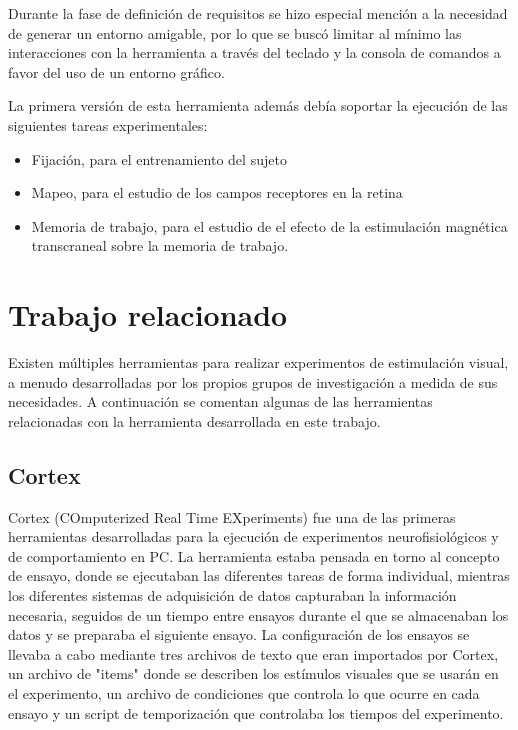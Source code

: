 \documentclass[conference]{IEEEtran}
\begin{document}
Durante la fase de definición de requisitos se hizo especial mención a la necesidad de generar un entorno amigable, por lo que se buscó limitar al mínimo las interacciones con la herramienta a través del teclado y la consola de comandos a favor del uso de un entorno gráfico.

La primera versión de esta herramienta además debía soportar la ejecución de las siguientes tareas experimentales:

\begin{itemize}
	\item Fijación, para el entrenamiento del sujeto
	\item Mapeo, para el estudio de los campos receptores en la retina
	\item Memoria de trabajo, para el estudio de el efecto de la estimulación magnética transcraneal sobre la memoria de trabajo.
\end{itemize}

\section{Trabajo relacionado}

Existen múltiples herramientas para realizar experimentos de estimulación visual, a menudo desarrolladas por los propios grupos de investigación a medida de sus necesidades. A continuación se comentan algunas de las herramientas relacionadas con la herramienta desarrollada en este trabajo.

\subsection{Cortex}

Cortex (COmputerized Real Time EXperiments)\cite{cortex} fue una de las primeras herramientas desarrolladas para la ejecución de experimentos neurofisiológicos y de comportamiento en PC.
La herramienta estaba pensada en torno al concepto de ensayo, donde se ejecutaban las diferentes tareas de forma individual, mientras los diferentes sistemas de adquisición de datos capturaban la información necesaria, seguidos de un tiempo entre ensayos durante el que se almacenaban los datos y se preparaba el siguiente ensayo. 
La configuración de los ensayos se llevaba a cabo mediante tres archivos de texto que eran importados por Cortex, un archivo de "items" donde se describen los estímulos visuales que se usarán en el experimento, un archivo de condiciones que controla lo que ocurre en cada ensayo y un script de temporización que controlaba los tiempos del experimento.
\end{document}
